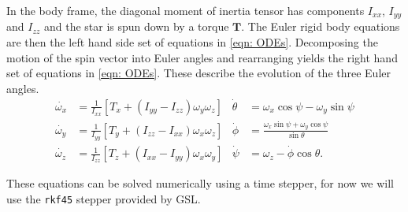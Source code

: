 \documentclass[../full_thesis/full_thesis.tex]{subfiles}
\begin{document}
In the body frame, the diagonal moment of inertia tensor has components
$I_{xx}$, $I_{yy}$ and $I_{zz}$ and the star is spun down by a torque
$\boldsymbol{T}$. The Euler rigid body equations are then the left hand side
set of equations in \eqref{eqn: ODEs}. Decomposing the motion of the spin
vector into Euler angles and rearranging yields the right hand set of equations
in \eqref{eqn: ODEs}. These describe the evolution of the three Euler angles.
\begin{align}
\dot{\omega_{x}} & = \frac{1}{I_{xx}}\left[T_{x} +
                      \left(I_{yy} - I_{zz}\right) \omega_{y} \omega_{z}\right]
&
\dot{\theta} & = \omega_{x} \cos \psi - \omega_{y} \sin \psi
\\
\dot{\omega_{y}} & = \frac{1}{I_{yy}}\left[T_{y} +
                      \left(I_{zz} - I_{xx}\right) \omega_{x} \omega_{z}\right]
&
\dot{\phi} & = \frac{\omega_{x} \sin \psi + \omega_{y} \cos \psi}{\sin \theta}
\\
\dot{\omega_{z}} & =\frac{1}{I_{zz}}\left[T_{z} +
                      \left(I_{xx} - I_{yy}\right) \omega_{x} \omega_{y}\right]
&
\dot{\psi} & = \omega_{z} - \dot{\phi} \cos \theta.
\label{eqn: ODEs}
\end{align}

These equations can be solved numerically using a time stepper, for now
we will use the \texttt{rkf45} stepper provided by GSL. %

\end{document}
